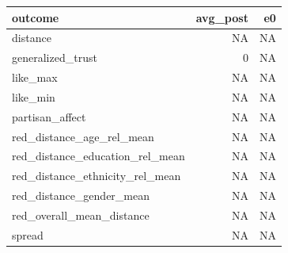 
\begin{tabular}{lrr}
\toprule
outcome & avg\_post & e0\\
\midrule
distance & NA & NA\\
generalized\_trust & 0 & NA\\
like\_max & NA & NA\\
like\_min & NA & NA\\
partisan\_affect & NA & NA\\
red\_distance\_age\_rel\_mean & NA & NA\\
red\_distance\_education\_rel\_mean & NA & NA\\
red\_distance\_ethnicity\_rel\_mean & NA & NA\\
red\_distance\_gender\_mean & NA & NA\\
red\_overall\_mean\_distance & NA & NA\\
spread & NA & NA\\
\bottomrule
\end{tabular}
